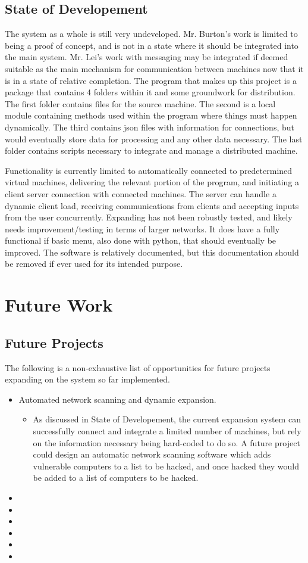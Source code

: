 \subsection{State of Developement}
The system as a whole is still very undeveloped. Mr. Burton’s work is limited to being a proof of concept, and is not in a state where it should be integrated into the main system. Mr. Lei’s work with messaging may be integrated if deemed suitable as the main mechanism for communication between machines now that it is in a state of relative completion. The program that makes up this project is a package that contains 4 folders within it and some groundwork for distribution. The first folder contains files for the source machine. The second is a local module containing methods used within the program where things must happen dynamically. The third contains json files with information for connections, but would eventually store data for processing and any other data necessary. The last folder contains scripts necessary to integrate and manage a distributed machine.


Functionality is currently limited to automatically connected to predetermined virtual machines, delivering the relevant portion of the program, and initiating a client server connection with connected machines. The server can handle a dynamic client load, receiving communications from clients and accepting inputs from the user concurrently. Expanding has not been robustly tested, and likely needs improvement/testing in terms of larger networks. It does have a fully functional if basic menu, also done with python, that should eventually be improved. The software is relatively documented, but this documentation should be removed if ever used for its intended purpose.
\section{Future Work}
\subsection{Future Projects}
The following is a non-exhaustive list of opportunities for future projects expanding on the system so far implemented.
\begin{itemize}
	\item Automated network scanning and dynamic expansion.
		\begin{itemize}
			\item As discussed in State of Developement, the current expansion system can successfully connect and integrate a limited number of machines, but rely on the information necessary being hard-coded to do so. A future project could design an automatic network scanning software which adds vulnerable computers to a list to be hacked, and once hacked they would be added to a list of computers to be hacked.
		\end{itemize}
	\item
	\item
	\item
	\item
	\item
	\item
\end{itemize}

